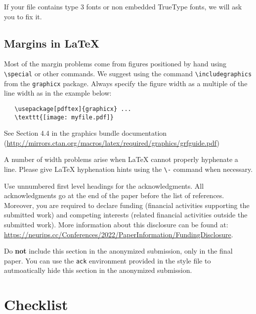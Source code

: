 \documentclass{article}
\begin{document}
If your file contains type 3 fonts or non embedded TrueType fonts, we will ask
you to fix it.

\subsection{Margins in \LaTeX{}}

Most of the margin problems come from figures positioned by hand using
\verb+\special+ or other commands. We suggest using the command
\verb+\includegraphics+ from the \verb+graphicx+ package. Always specify the
figure width as a multiple of the line width as in the example below:
\begin{verbatim}
   \usepackage[pdftex]{graphicx} ...
   \texttt{[image: myfile.pdf]}
\end{verbatim}
See Section 4.4 in the graphics bundle documentation
(\url{http://mirrors.ctan.org/macros/latex/required/graphics/grfguide.pdf})

A number of width problems arise when \LaTeX{} cannot properly hyphenate a
line. Please give LaTeX hyphenation hints using the \verb+\-+ command when
necessary.

\begin{ack}
      Use unnumbered first level headings for the acknowledgments. All acknowledgments
      go at the end of the paper before the list of references. Moreover, you are required to declare
      funding (financial activities supporting the submitted work) and competing interests (related financial activities outside the submitted work).
      More information about this disclosure can be found at: \url{https://neurips.cc/Conferences/2022/PaperInformation/FundingDisclosure}.

      Do {\bf not} include this section in the anonymized submission, only in the
      final paper. You can use the \texttt{ack} environment provided in the style
      file to autmoatically hide this section in the anonymized submission.
\end{ack}

\section*{Checklist}
\end{document}
